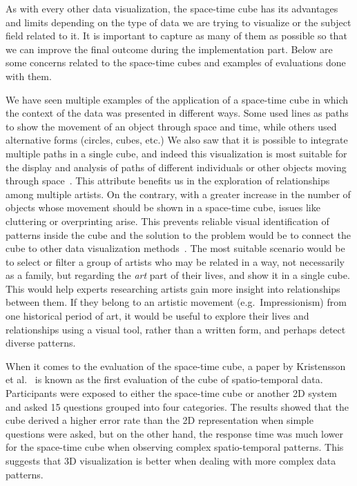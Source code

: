 As with every other data visualization, the space-time cube has its advantages and limits depending on the type of data we are trying to
visualize or the subject field related to it. It is important to capture as many of them as possible so that we can improve the final outcome
during the implementation part. Below are some concerns related to the space-time cubes and examples of evaluations done with them.

We have seen multiple examples of the application of a space-time cube in which the context of the data was presented in different ways.
Some used lines as paths to show the movement of an object through space and time, while others used alternative forms (circles, cubes,
etc.) We also saw that it is possible to integrate multiple paths in a single cube, and indeed this visualization is most suitable for 
the display and analysis of paths of different individuals or other objects moving through space~\citep{kraak2003space, persson2020survey}. This
attribute benefits us in the exploration of relationships among multiple artists. On the contrary, with a greater increase in the number of
objects whose movement should be shown in a space-time cube, issues like cluttering or overprinting arise. This prevents reliable visual
identification of patterns inside the cube and the solution to the problem would be to connect the cube to other data visualization
methods~\citep{demvsar2010space}. The most suitable scenario would be to select or filter a group of artists who may be related in a way, not
necessarily as a family, but regarding the \emph{art} part of their lives, and show it in a single cube. This would help experts researching
artists gain more insight into relationships between them. If they belong to an artistic movement (e.g.\ Impressionism) from one historical period
of art, it would be useful to explore their lives and relationships using a visual tool, rather than a written form, and perhaps detect diverse
patterns.

When it comes to the evaluation of the space-time cube, a paper by Kristensson et al.~\citep{kristensson2008evaluation} is known as the first
evaluation of the cube of spatio-temporal data. Participants were exposed to either the space-time cube or another 2D system and asked 15
questions grouped into four categories. The results showed that the cube derived a higher error rate than the 2D representation when simple
questions were asked, but on the other hand, the response time was much lower for the space-time cube when observing complex spatio-temporal
patterns. This suggests that 3D visualization is better when dealing with more complex data patterns.

